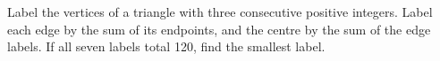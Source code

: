 Label the vertices of a triangle with three consecutive positive integers. Label each edge by the sum of its endpoints, and the centre by the sum of the edge labels. If all seven labels total 120, find the smallest label.
